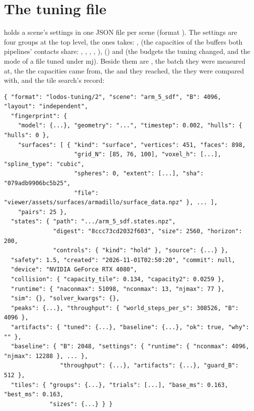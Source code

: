 \section{The tuning file}\label{sec:file}

 holds a scene's settings in one JSON file per scene (format ). The settings are four groups at the top level, the ones  takes: ,  (the capacities of the buffers both pipelines' contacts share: , , , , ),  () and  (the budgets the tuning changed, and the mode of a file tuned under mj). Beside them are , the batch they were measured at, the  the capacities came from, the  and  they reached, the  they were compared with, and the tile search's record:

\begin{lstlisting}[language={}]
{ "format": "lodos-tuning/2", "scene": "arm_5_sdf", "B": 4096, "layout": "independent",
  "fingerprint": {
    "model": {...}, "geometry": "...", "timestep": 0.002, "hulls": { "hulls": 0 },
    "surfaces": [ { "kind": "surface", "vertices": 451, "faces": 898,
                    "grid_N": [85, 76, 100], "voxel_h": [...], "spline_type": "cubic",
                    "spheres": 0, "extent": [...], "sha": "079adb9906bc5b25",
                    "file": "viewer/assets/surfaces/armadillo/surface_data.npz" }, ... ],
    "pairs": 25 },
  "states": { "path": ".../arm_5_sdf.states.npz",
              "digest": "8ccc73cd2032f603", "size": 2560, "horizon": 200,
              "controls": { "kind": "hold" }, "source": {...} },
  "safety": 1.5, "created": "2026-11-01T02:50:20", "commit": null,
  "device": "NVIDIA GeForce RTX 4080",
  "collision": { "capacity_tile": 0.134, "capacity2": 0.0259 },
  "runtime": { "naconmax": 51098, "nconmax": 13, "njmax": 77 },
  "sim": {}, "solver_kwargs": {},
  "peaks": {...}, "throughput": { "world_steps_per_s": 308526, "B": 4096 },
  "artifacts": { "tuned": {...}, "baseline": {...}, "ok": true, "why": "" },
  "baseline": { "B": 2048, "settings": { "runtime": { "nconmax": 4096, "njmax": 12288 }, ... },
                "throughput": {...}, "artifacts": {...}, "guard_B": 512 },
  "tiles": { "groups": {...}, "trials": [...], "base_ms": 0.163, "best_ms": 0.163,
             "sizes": {...} } }
\end{lstlisting}

